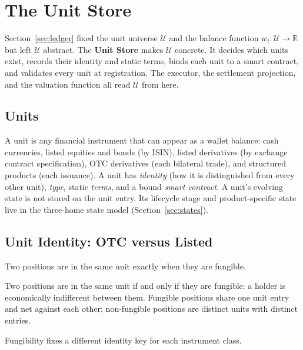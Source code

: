 \section{The Unit Store}
\label{sec:unit-store}
\newtheorem*{condition}{Condition}

Section~\ref{sec:ledger} fixed the unit universe $\mathcal{U}$ and the balance function $w_t : \mathcal{U} \to \mathbb{R}$ but left $\mathcal{U}$ abstract. The \textbf{Unit Store} makes $\mathcal{U}$ concrete. It decides which units exist, records their identity and static terms, binds each unit to a smart contract, and validates every unit at registration. The executor, the settlement projection, and the valuation function all read $\mathcal{U}$ from here.

\subsection{Units}

A unit is any financial instrument that can appear as a wallet balance: cash currencies, listed equities and bonds (by ISIN), listed derivatives (by exchange contract specification), OTC derivatives (each bilateral trade), and structured products (each issuance). A unit has \emph{identity} (how it is distinguished from every other unit), \emph{type}, static \emph{terms}, and a bound \emph{smart contract}. A unit's evolving state is not stored on the unit entry. Its lifecycle stage and product-specific state live in the three-home state model (Section~\ref{sec:states}).

\subsection{Unit Identity: OTC versus Listed}
\label{sec:unit-identity}

Two positions are in the same unit exactly when they are fungible.

\begin{principle}
\label{prin:unit-identity}
Two positions are in the same unit if and only if they are fungible: a holder is economically indifferent between them. Fungible positions share one unit entry and net against each other; non-fungible positions are distinct units with distinct entries.
\end{principle}

Fungibility fixes a different identity key for each instrument class.


